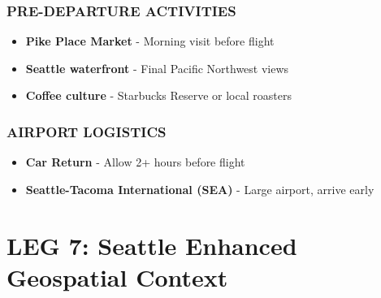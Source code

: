 \documentclass[
  11pt,
]{article}
\providecommand{\tightlist}{%
  \setlength{\itemsep}{0pt}\setlength{\parskip}{0pt}}
\begin{document}
\subsubsection{\texorpdfstring{\textcolor{primary}{PRE-DEPARTURE ACTIVITIES}}{}}\label{section-50}

\begin{itemize}
\tightlist
\item
  \textbf{\textcolor{secondary}{Pike Place Market}} - Morning visit
  before flight
\item
  \textbf{\textcolor{secondary}{Seattle waterfront}} - Final Pacific
  Northwest views\\
\item
  \textbf{\textcolor{secondary}{Coffee culture}} - Starbucks Reserve or
  local roasters
\end{itemize}

\subsubsection{\texorpdfstring{\textcolor{primary}{AIRPORT LOGISTICS}}{}}\label{section-51}

\begin{itemize}
\tightlist
\item
  \textbf{\textcolor{secondary}{Car Return}} - Allow 2+ hours before
  flight
\item
  \textbf{\textcolor{secondary}{Seattle-Tacoma International (SEA)}} -
  Large airport, arrive early
\end{itemize}

\newpage

\section{\texorpdfstring{\textcolor{primary}{LEG 7: Seattle Enhanced Geospatial Context}}{}}\label{section-52}
\end{document}
